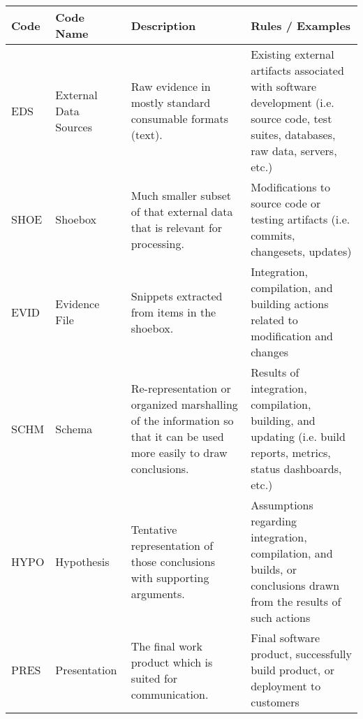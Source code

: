 \documentclass{sig-alternate-05-2015}
\begin{document}
\begin{table}[b]
\begin{tabular}[b]{ | l | l | l | l | }
	\hline
	Code & Code Name & Description & Rules / Examples \\ \hline
	EDS & External Data Sources & Raw evidence in mostly standard consumable formats (text). & Existing external artifacts associated with software development (i.e. source code, test suites, databases, raw data, servers, etc.) \\ \hline
	SHOE & Shoebox & Much smaller subset of that external data that is relevant for processing. & Modifications to source code or testing artifacts (i.e. commits, changesets, updates) \\ \hline
	EVID & Evidence File & Snippets extracted from items in the shoebox. & Integration, compilation, and building actions related to modification and changes \\ \hline
	SCHM & Schema & Re-representation or organized marshalling of the information so that it can be used more easily to draw conclusions. & Results of integration, compilation, building, and updating (i.e. build reports, metrics, status dashboards, etc.) \\ \hline
	HYPO & Hypothesis & Tentative representation of those conclusions with supporting arguments. & Assumptions regarding integration, compilation, and builds, or conclusions drawn from the results of such actions \\ \hline
	PRES & Presentation & The final work product which is suited for communication. & Final software product, successfully build product, or deployment to customers \\ \hline
\end{tabular}
\end{table}
\end{document}
